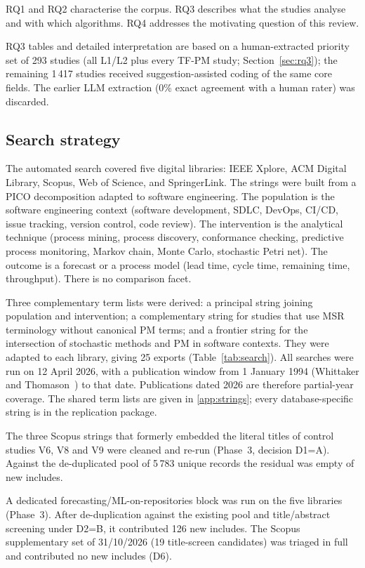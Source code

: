 \documentclass[preprint,12pt,authoryear=false]{elsarticle}
\newcommand{\PM}{TF-PM}
\begin{document}
RQ1 and RQ2 characterise the corpus. RQ3 describes what the studies analyse and with which algorithms. RQ4 addresses the motivating question of this review.

RQ3 tables and detailed interpretation are based on a human-extracted priority set of 293 studies (all L1/L2 plus every \PM{} study; Section~\ref{sec:rq3}); the remaining 1\,417 studies received suggestion-assisted coding of the same core fields. The earlier LLM extraction (0\% exact agreement with a human rater) was discarded.

\subsection{Search strategy}\label{sec:search}

The automated search covered five digital libraries: IEEE Xplore, ACM Digital Library, Scopus, Web of Science, and SpringerLink. The strings were built from a PICO decomposition adapted to software engineering. The population is the software engineering context (software development, SDLC, DevOps, CI/CD, issue tracking, version control, code review). The intervention is the analytical technique (process mining, process discovery, conformance checking, predictive process monitoring, Markov chain, Monte Carlo, stochastic Petri net). The outcome is a forecast or a process model (lead time, cycle time, remaining time, throughput). There is no comparison facet.

Three complementary term lists were derived: a principal string joining population and intervention; a complementary string for studies that use MSR terminology without canonical PM terms; and a frontier string for the intersection of stochastic methods and PM in software contexts. They were adapted to each library, giving 25 exports (Table~\ref{tab:search}). All searches were run on 12 April 2026, with a publication window from 1 January 1994 (Whittaker and Thomason~\cite{whittaker1994}) to that date. Publications dated 2026 are therefore partial-year coverage. The shared term lists are given in \ref{app:strings}; every database-specific string is in the replication package.

The three Scopus strings that formerly embedded the literal titles of control studies V6, V8 and V9 were cleaned and re-run (Phase~3, decision D1=A). Against the de-duplicated pool of 5\,783 unique records the residual was empty of new includes.

A dedicated forecasting/ML-on-repositories block was run on the five libraries (Phase~3). After de-duplication against the existing pool and title/abstract screening under D2=B, it contributed 126 new includes. The Scopus supplementary set of 31/10/2026 (19 title-screen candidates) was triaged in full and contributed no new includes (D6).
\end{document}
